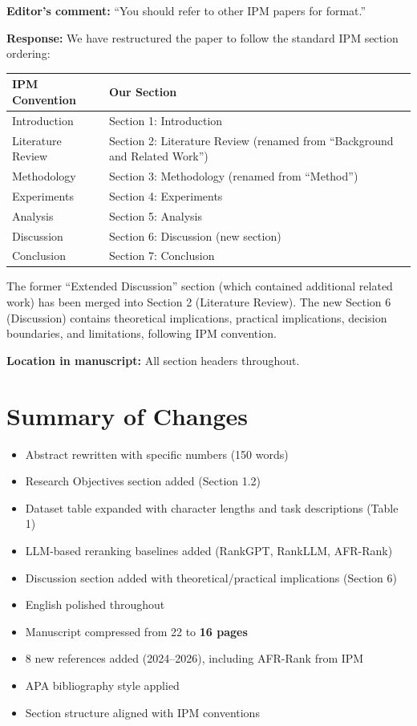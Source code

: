 \documentclass[11pt]{article}
\begin{document}
\textbf{Editor's comment:} ``You should refer to other IPM papers for format.''

\textbf{Response:} We have restructured the paper to follow the standard IPM section ordering:

\begin{center}
\begin{tabular}{ll}
\toprule
\textbf{IPM Convention} & \textbf{Our Section} \\
\midrule
Introduction              & Section 1: Introduction \\
Literature Review         & Section 2: Literature Review (renamed from ``Background and Related Work'') \\
Methodology               & Section 3: Methodology (renamed from ``Method'') \\
Experiments               & Section 4: Experiments \\
Analysis                  & Section 5: Analysis \\
Discussion                & Section 6: Discussion (new section) \\
Conclusion                & Section 7: Conclusion \\
\bottomrule
\end{tabular}
\end{center}

The former ``Extended Discussion'' section (which contained additional related work) has been merged into Section 2 (Literature Review). The new Section 6 (Discussion) contains theoretical implications, practical implications, decision boundaries, and limitations, following IPM convention.

\textbf{Location in manuscript:} All section headers throughout.

\section*{Summary of Changes}

\begin{itemize}[leftmargin=*]
\item Abstract rewritten with specific numbers (150 words)
\item Research Objectives section added (Section 1.2)
\item Dataset table expanded with character lengths and task descriptions (Table 1)
\item LLM-based reranking baselines added (RankGPT, RankLLM, AFR-Rank)
\item Discussion section added with theoretical/practical implications (Section 6)
\item English polished throughout
\item Manuscript compressed from 22 to \textbf{16 pages}
\item 8 new references added (2024--2026), including AFR-Rank from IPM
\item APA bibliography style applied
\item Section structure aligned with IPM conventions
\end{itemize}
\end{document}
